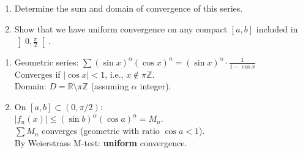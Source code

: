 \documentclass[12pt]{article}
\begin{document}
\begin{enumerate}
    \item Determine the sum and domain of convergence of this series.
    \item Show that we have uniform convergence on any compact $[a, b]$ included in $\left]0, \frac{\pi}{2}\right[$.
\end{enumerate}

\newpage

\begin{correctionbox}
\begin{enumerate}
    \item Geometric series: $\sum (\sin x)^\alpha (\cos x)^n = (\sin x)^\alpha \cdot \frac{1}{1-\cos x}$ \\
    Converges if $|\cos x|<1$, i.e., $x\notin\pi\mathbb{Z}$. \\
    Domain: $D=\mathbb{R}\setminus\pi\mathbb{Z}$ (assuming $\alpha$ integer).

    \item On $[a,b]\subset(0,\pi/2)$: \\
    $|f_n(x)|\leq (\sin b)^\alpha (\cos a)^n = M_n$. \\
    $\sum M_n$ converges (geometric with ratio $\cos a<1$). \\
    By Weierstrass M-test: \textbf{uniform} convergence.
\end{enumerate}
\end{correctionbox}
\end{document}
